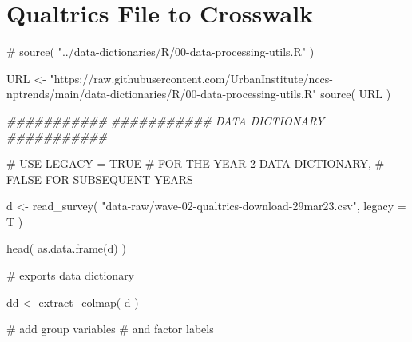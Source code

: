 \documentclass[
  letterpaper,
]{scrbook}
\newenvironment{Shaded}{\begin{snugshade}}{\end{snugshade}}
\newcommand{\AttributeTok}[1]{\textcolor[rgb]{0.40,0.45,0.13}{#1}}
\newcommand{\CommentTok}[1]{\textcolor[rgb]{0.37,0.37,0.37}{#1}}
\newcommand{\DocumentationTok}[1]{\textcolor[rgb]{0.37,0.37,0.37}{\textit{#1}}}
\newcommand{\FunctionTok}[1]{\textcolor[rgb]{0.28,0.35,0.67}{#1}}
\newcommand{\NormalTok}[1]{\textcolor[rgb]{0.00,0.23,0.31}{#1}}
\newcommand{\OtherTok}[1]{\textcolor[rgb]{0.00,0.23,0.31}{#1}}
\newcommand{\StringTok}[1]{\textcolor[rgb]{0.13,0.47,0.30}{#1}}
\begin{document}
\section{Qualtrics File to Crosswalk}\label{qualtrics-file-to-crosswalk}

\begin{Shaded}
\begin{Highlighting}[]
\CommentTok{\# source( "../data{-}dictionaries/R/00{-}data{-}processing{-}utils.R" )}

\NormalTok{URL }\OtherTok{\textless{}{-}} \StringTok{"https://raw.githubusercontent.com/UrbanInstitute/nccs{-}nptrends/main/data{-}dictionaries/R/00{-}data{-}processing{-}utils.R"}
\FunctionTok{source}\NormalTok{( URL )}

\DocumentationTok{\#\#\#\#\#\#\#\#\#\#\#}
\DocumentationTok{\#\#\#\#\#\#\#\#\#\#\#   DATA DICTIONARY}
\DocumentationTok{\#\#\#\#\#\#\#\#\#\#\#}

\CommentTok{\# USE LEGACY = TRUE}
\CommentTok{\# FOR THE YEAR 2 DATA DICTIONARY,}
\CommentTok{\# FALSE FOR SUBSEQUENT YEARS }

\NormalTok{d }\OtherTok{\textless{}{-}} 
  \FunctionTok{read\_survey}\NormalTok{( }
    \StringTok{"data{-}raw/wave{-}02{-}qualtrics{-}download{-}29mar23.csv"}\NormalTok{, }
    \AttributeTok{legacy =}\NormalTok{ T )}

\FunctionTok{head}\NormalTok{( }\FunctionTok{as.data.frame}\NormalTok{(d) )}

\CommentTok{\# exports data dictionary }

\NormalTok{dd }\OtherTok{\textless{}{-}} \FunctionTok{extract\_colmap}\NormalTok{( d )  }

\CommentTok{\# add group variables}
\CommentTok{\# and factor labels }


\end{Highlighting}
\end{Shaded}
\end{document}
